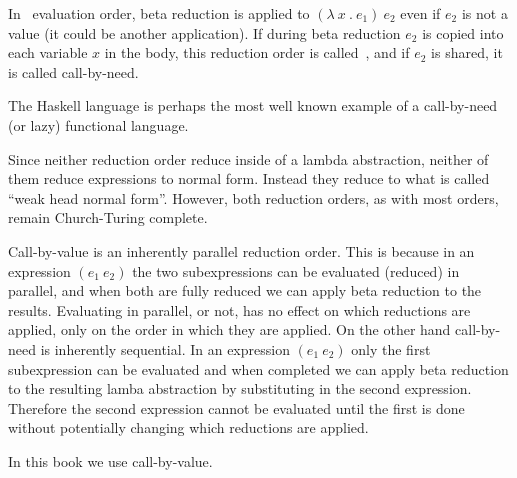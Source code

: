 \begin{flex}
\begin{definition}
In~ evaluation order,
beta reduction is applied to
$(\lambda~x~.~e_1)~e_2$ even if $e_2$ is not a value (it could be another application).
% 
If during beta reduction $e_2$ is copied into each variable $x$ in the
body, this reduction order is called~, and if $e_2$
is shared, it is called call-by-need.  
%
\end{definition}

\begin{example}
The Haskell language is perhaps the most well known example of a
call-by-need (or lazy) functional language.
\end{example}

\end{flex}

\begin{gram}
  Since neither reduction order reduce inside of a
  lambda abstraction, neither of them reduce expressions to normal form.  Instead they
  reduce to what is called ``weak head normal form''.
  However, both reduction orders, as with most orders, remain Church-Turing complete.
\end{gram}

\begin{gram}
Call-by-value is an inherently parallel reduction order.    This is
because in an expression $(e_1~e_2)$ the two subexpressions can be
evaluated (reduced) in parallel, and when both are fully reduced we can apply
beta reduction to the results.    Evaluating in parallel, or not, has no
effect on which reductions are applied, only on the order in which
they are applied.
%
On the other hand call-by-need is inherently sequential.    In an
expression $(e_1~e_2)$  only the first subexpression can be evaluated and
when completed we can apply beta reduction to the resulting lamba
abstraction by substituting in the second expression.     Therefore
the second expression cannot be evaluated until the first is done
without potentially changing which reductions are applied.
%

In this book we use call-by-value.
\end{gram}

